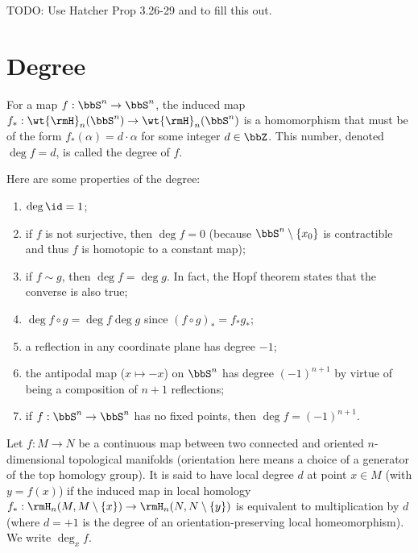 TODO: Use Hatcher Prop 3.26-29 and  to fill this out.





\section{Degree}

\begin{defn}\label{Degree}
    For a map $f:\bbS^n\to \bbS^n$, the induced map $f_\ast:\wt{\rmH}_n(\bbS^n)\to \wt{\rmH}_n(\bbS^n)$ is a homomorphism that must be of the form $f_\ast(\alpha)=d\cdot \alpha$ for some integer $d\in\bbZ$. This number, denoted $\deg f=d$, is called the degree of $f$.
\end{defn}
Here are some properties of the degree:
\begin{enumerate}
    \item $\deg\id=1$;
    \item if $f$ is not surjective, then $\deg f=0$ (because $\bbS^n\setminus\{x_0\}$ is contractible and thus $f$ is homotopic to a constant map);
    \item if $f\sim g$, then $\deg f=\deg g$. In fact, the Hopf theorem states that the converse is also true;
    \item $\deg f\circ g=\deg f\deg g$ since $(f\circ g)_\ast=f_\ast g_\ast $;
    \item a reflection in any coordinate plane has degree $-1$;
    \item the antipodal map ($x\mapsto -x$) on $\bbS^n$ has degree $(-1)^{n+1}$ by virtue of being a composition of $n+1$ reflections;
    \item if $f:\bbS^n\to \bbS^n$ has no fixed points, then $\deg f=(-1)^{n+1}$.
\end{enumerate}


\begin{defn}
    Let $f:M\to N$ be a continuous map between two connected and oriented $n$-dimensional topological manifolds (orientation here means a choice of a generator of the top homology group). It is said to have local degree $d$ at point $x\in M$ (with $y=f(x)$) if the induced map in local homology $f_\ast:\rmH_n(M,M\setminus\{x\})\to \rmH_n(N,N\setminus\{y\})$ is equivalent to multiplication by $d$ (where $d=+1$ is the degree of an orientation-preserving local homeomorphism). We write $\deg_x f$.
\end{defn}

